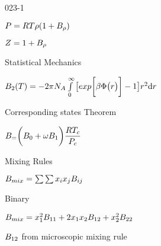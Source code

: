 \begin{mitframe}{023-1} %

    
\begin{listone}
        
    \item $\p=\gasconst\Temp\dens(1+\virialcoeff \dens)$
    
    \item$\compress= 1+\virialcoeff \dens$
    
    \item Statistical Mechanics
    
    \begin{listtwo}
		
        \item $\virialcoeff{2}(\Temp)=-2\pi\av\int\limits_{0}^{\infty}\big[exp\bigg[\boltznorm\pot\big(\pos\big)\bigg]-1\big]\pos^2\mathrm{d}\pos$
     
    \end{listtwo}
    
    \item Corresponding states Theorem

    \begin{listtwo}
		
    \item $\virialcoeff=\bigg(\virialcoeff{\init}+\accentfac\virialcoeff{1}\bigg)\dfrac{\gasconst\Temp_{c}}{\p_{c}}$
    
    
          	
    \end{listtwo}
    
    \item Mixing Rules
    
    \begin{listtwo}
		
    \item $\virialcoeff{\mixfunc} =\sum\sum\specfrac{i}\specfrac{j}\virialcoeff{ij}$
        
   	\item Binary
        
        \begin{listthree}
		
           \item$\virialcoeff{\mixfunc} =\disp_{1}^{2}\virialcoeff{11}+2\disp_{1}\disp_{2}\virialcoeff{12}+\disp_{2}^{2}\virialcoeff{22}$
			\item $\virialcoeff{12}$  from microscopic mixing rule
                

\end{listthree}
\end{listtwo}
\end{listone}
\end{mitframe}
